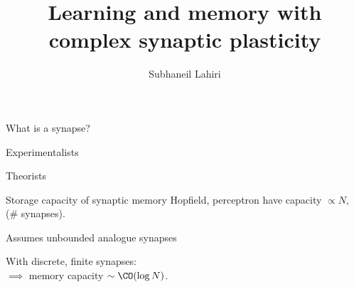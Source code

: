 \documentclass[final]{beamer}%
\title[Complex synapses]{Learning and memory with complex synaptic plasticity}
\author{Subhaneil Lahiri%
}
\institute[Stanford]{%
Stanford University, Applied Physics
}
\begin{document}

\begin{frame}
%
 \titlepage
%
\end{frame}


\begin{frame}{What is a synapse?}
%
 \begin{center}
 \parbox[c]{0.45\linewidth}{
  \begin{center}
    Experimentalists
  \end{center}
 }
 \parbox[c]{0.45\linewidth}{
  \begin{center}
    Theorists
  \end{center}
 }

 \parbox[c]{0.45\linewidth}{
 }
 \parbox[c]{0.45\linewidth}{
 }
 \end{center}
%
\end{frame}


\begin{frame}{Storage capacity of synaptic memory}
%
  Hopfield, perceptron have capacity \alert{$\propto N$}, (\# synapses).

\vp\parbox[t]{0.59\linewidth}{%
  Assumes unbounded analogue synapses

 \vp With discrete, finite synapses:\\
 $\implies$ memory capacity  \alert{$\sim\CO(\log N)$}.
 \\ 
 }
 \parbox[t]{0.4\linewidth}{
    \hfill{}
 }
 \\


%
\end{frame}
\end{document}
